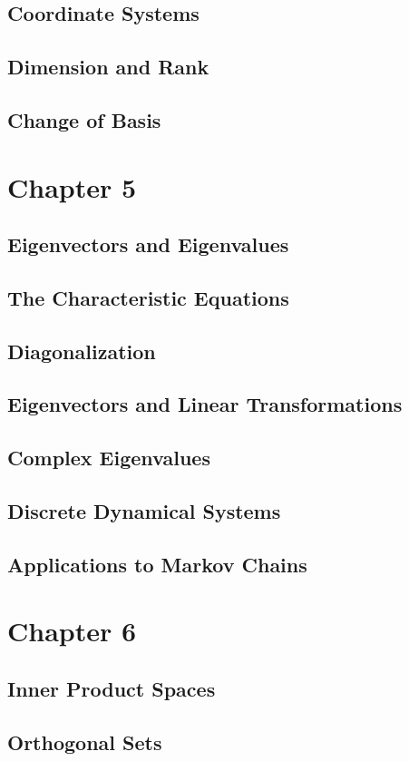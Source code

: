 \documentclass{article}
\begin{document}
\subsection{Coordinate Systems}
\subsection{Dimension and Rank}
\subsection{Change of Basis}
\section{Chapter 5}
\subsection{Eigenvectors and Eigenvalues}
\subsection{The Characteristic Equations}
\subsection{Diagonalization}
\subsection{Eigenvectors and Linear Transformations}
\subsection{Complex Eigenvalues}
\subsection{Discrete Dynamical Systems}
\subsection{Applications to Markov Chains}
\section{Chapter 6}
\subsection{Inner Product Spaces}
\subsection{Orthogonal Sets}
\end{document}

